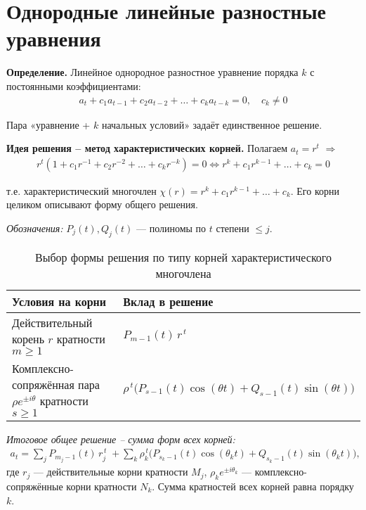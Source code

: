 \section{Однородные линейные разностные уравнения}\label{sec:homogeneous}

\begin{center}
\end{center}

\textbf{Определение.} Линейное однородное разностное уравнение порядка $k$ с постоянными коэффициентами:
\begin{align}
a_t + c_1 a_{t-1} + c_2 a_{t-2} + \dots + c_k a_{t-k} = 0, \quad c_k \neq 0
\end{align}

Пара «уравнение + $k$ начальных условий» задаёт единственное решение.

\textbf{Идея решения -- метод характеристических корней.} Полагаем $a_t = r^t$ $\Rightarrow$
\begin{align}
r^t (1 + c_1 r^{-1} + c_2 r^{-2} + \dots + c_k r^{-k}) = 0 \iff r^k + c_1 r^{k-1} + \dots + c_k = 0
\end{align}

т.е. характеристический многочлен $\chi(r) = r^k + c_1 r^{k-1} + \dots + c_k$. Его корни целиком описывают форму общего решения.

\textit{Обозначения:} $P_j(t), Q_j(t)$ — полиномы по $t$ степени $\le j$.

\begin{table}[h!]
\centering
\caption{Выбор формы решения по типу корней характеристического многочлена}
\label{tab:form-choices}
\begin{tabular}{|l|l|}
\hline
\textbf{Условия на корни} & \textbf{Вклад в решение} \\
\hline
Действительный корень $r$ кратности $m\ge 1$ &
$P_{m-1}(t)\, r^{\,t}$ \\
\hline
Комплексно-сопряжённая пара $\rho e^{\pm i\theta}$ кратности $s\ge 1$ &
$\rho^{\,t}\big(P_{s-1}(t)\cos(\theta t)+Q_{s-1}(t)\sin(\theta t)\big)$ \\
\hline
\end{tabular}

\vspace{0.5em}
\emph{Итоговое общее решение -- сумма форм всех корней:}
\begin{align*}
a_t = \sum_{j} P_{m_j-1}(t)\, r_j^{\,t}
\; + \sum_{k} \rho_k^{\,t}\big(P_{s_k-1}(t)\cos(\theta_k t)+Q_{s_k-1}(t)\sin(\theta_k t)\big),
\end{align*}
где $r_j$ — действительные корни кратности $M_j$, $\rho_k e^{\pm i\theta_k}$ — комплексно-сопряжённые корни кратности $N_k$.
Сумма кратностей всех корней равна порядку $k$.
\end{table}

